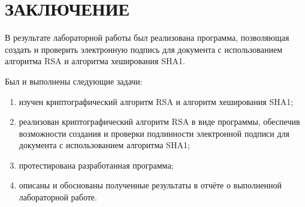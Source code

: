 \chapter*{ЗАКЛЮЧЕНИЕ}

В результате лабораторной работы был реализована программа, позволяющая создать и проверить электронную подпись для документа с использованием алгоритма RSA и алгоритма хеширования SHA1.

Был и выполнены следующие задачи:
\begin{enumerate}
	\item изучен криптографический алгоритм RSA и алгоритм хеширования SHA1;
	\item реализован криптографический алгоритм RSA в виде программы, обеспечив возможности создания и проверки подлинности электронной подписи для документа с использованием алгоритма SHA1;
	\item протестирована разработанная программа;
	\item описаны и обоснованы полученные результаты в отчёте о выполненной лабораторной работе.
\end{enumerate}
